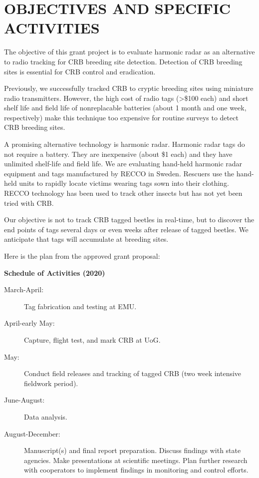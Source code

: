 \documentclass[12pt,letterpaper,english,bibliography=totocnumbered,abstract=on]{scrartcl}
\begin{document}
\listoftodos

\newpage


\section{OBJECTIVES AND SPECIFIC ACTIVITIES} 


The objective of this grant project is to evaluate harmonic radar as an alternative to radio tracking for CRB breeding site detection. Detection of CRB breeding sites is essential for CRB control and eradication.

Previously, we successfully tracked CRB to cryptic breeding sites using miniature radio transmitters. However, the high cost of radio tags (>\$100 each) and short shelf life and field life of nonreplacable batteries (about 1 month and one week, respectively) make this technique too expensive for routine surveys to detect CRB breeding sites. 

A promising alternative technology is harmonic radar. Harmonic radar tags do not require a battery. They are inexpensive (about \$1 each) and they have unlimited shelf-life and field life. We are evaluating hand-held harmonic radar equipment and tags manufactured by RECCO in Sweden. Rescuers use the hand-held units to rapidly locate victims wearing tags sown into their clothing. RECCO technology has been used to track other insects but has not yet been tried with CRB.

Our objective is not to track CRB tagged beetles in real-time, but to discover the end points of tags several days or even weeks after release of tagged beetles. We anticipate that tags will accumulate at breeding sites.

Here is the plan from the approved grant proposal:

\medskip
\colorbox[gray]{0.9}{\parbox{\textwidth}{
	\textbf{Schedule of Activities (2020)}
	\begin{description}
		\item[March-April:] Tag fabrication and testing at EMU.
		\item[April-early May:] Capture, flight test, and mark CRB at UoG.
		\item[May:] Conduct field releases and tracking of tagged CRB (two week intensive fieldwork period).
		\item[June-August:] Data analysis.
		\item[August-December:] Manuscript(s) and final report preparation.  Discuss findings with state agencies.  Make presentations at scientific meetings.  Plan further research with cooperators to implement findings in monitoring and control efforts.
	\end{description}
}}
\medskip
\end{document}
